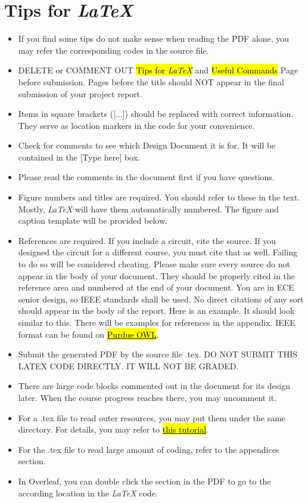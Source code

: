 \documentclass[letterpaper, 11pt]{article}
\begin{document}
\section*{Tips for \textit{\LaTeX}}
\begin{itemize}
    \item If you find some tips do not make sense when reading the PDF alone, you may refer the corresponding codes in the source file.
    \item DELETE or COMMENT OUT \hl{Tips for \textit{\LaTeX}} and \hl{Useful Commands} Page before submission. Pages before the title should NOT appear in the final submission of your project report.
    \item Items in square brackets ([...]) should be replaced with correct information. They serve as location markers in the code for your convenience.
    \item Check for comments to see which Design Document it is for. It will be contained in the [Type here] box.
    \item Please read the comments in the document first if you have questions. %
    \item Figure numbers and titles are required. You should refer to these in the text. Mostly, \textit{\LaTeX} will have them automatically numbered. The figure and caption template will be provided below.
    \item References are required. If you include a circuit, cite the source. If you designed the circuit for a different course, you must cite that as well. Failing to do so will be considered cheating. Please make sure every source do not appear in the body of your document. They should be properly cited in the reference area and numbered at the end of your document. You are in ECE senior design, so IEEE standards shall be used. No direct citations of any sort should appear in the body of the report. Here is an example. \cite{b1} It should look similar to this. There will be examples for references in the appendix. IEEE format can be found on \href{https://owl.purdue.edu/owl/research_and_citation/ieee_style/ieee_overview.html}{\hl{Purdue OWL}}.
    \item Submit the generated PDF by the source file .tex. DO NOT SUBMIT THIS LATEX CODE DIRECTLY. IT WILL NOT BE GRADED.
    \item There are large code blocks commented out in the document for its design later. When the course progress reaches there, you may uncomment it.
    \item For a .tex file to read outer resources, you may put them under the same directory. For details, you may refer to \href{https://www.overleaf.com/learn/latex/Inserting_Images}{\hl{this tutorial}}.
    \item For the .tex file to read large amount of coding, refer to the appendices section.
    \item In Overleaf, you can double click the section in the PDF to go to the according location in the \textit{\LaTeX} code.
\end{itemize}
\end{document}
